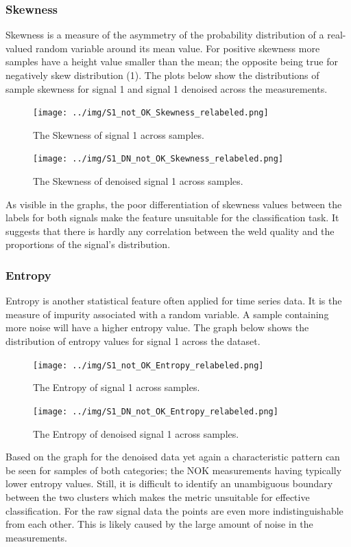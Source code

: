 \documentclass[12pt]{report}
\begin{document}
\subsubsection{Skewness}
Skewness is a measure of the asymmetry of the probability distribution of a real-valued random variable around its mean value. For positive skewness more samples have a height value smaller than the mean; the opposite being true for negatively skew distribution (1). The plots below show the distributions of sample skewness for signal 1 and signal 1 denoised across the measurements.
\begin{figure}[H]
	\centering
	\texttt{[image: ../img/S1\_not\_OK\_Skewness\_relabeled.png]}
	\caption{The Skewness of signal 1 across samples.}
	\label{fig:S1SK}
\end{figure}
\begin{figure}[H]
	\centering
	\texttt{[image: ../img/S1\_DN\_not\_OK\_Skewness\_relabeled.png]}
	\caption{The Skewness of denoised signal 1 across samples.}
	\label{fig:S1DNSK}
\end{figure}

As visible in the graphs, the poor differentiation of skewness values between the labels for both signals make the feature unsuitable for the classification task. It suggests that there is hardly any correlation between the weld quality and the proportions of the signal’s distribution.
\subsubsection{Entropy}
Entropy is another statistical feature often applied for time series data. It is the measure of impurity associated with a random variable. A sample containing more noise will have a higher entropy value. The graph below shows the distribution of entropy values for signal 1 across the dataset.
\begin{figure}[H]
	\centering
	\texttt{[image: ../img/S1\_not\_OK\_Entropy\_relabeled.png]}
	\caption{The Entropy of signal 1 across samples.}
	\label{fig:S1EN}
\end{figure}
\begin{figure}[H]
	\centering
	\texttt{[image: ../img/S1\_DN\_not\_OK\_Entropy\_relabeled.png]}
	\caption{The Entropy of denoised signal 1 across samples.}
	\label{fig:S1DNEN}
\end{figure}
Based on the graph for the denoised data yet again a characteristic pattern can be seen for samples of both categories; the NOK measurements having typically lower entropy values. Still, it is difficult to identify an unambiguous boundary between the two clusters which makes the metric unsuitable for effective classification. For the raw signal data the points are even more indistinguishable from each other. This is likely caused by the large amount of noise in the measurements.
\end{document}
